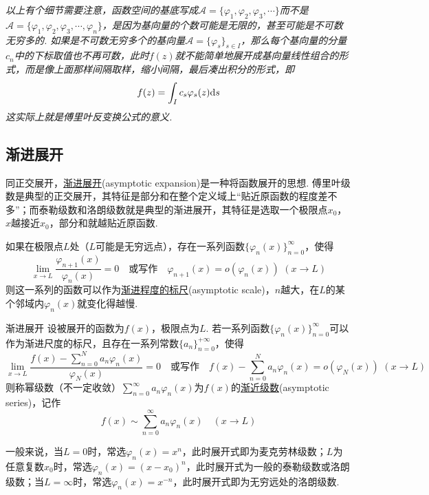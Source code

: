 \documentclass[main.tex]{subfiles}
\begin{document}
\textit{
    以上有个细节需要注意，函数空间的基底写成\(\mathcal{A}=\{\varphi_1,\varphi_2,\varphi_3,\cdots\}\)而不是\(\mathcal{A}=\{\varphi_1,\varphi_2,\varphi_3,\cdots,\varphi_n\}\)，是因为基向量的个数可能是无限的，甚至可能是不可数无穷多的. 如果是不可数无穷多个的基向量\(\mathcal{A}=\{\varphi_s\}_{s \in I}\)，那么每个基向量的分量\(c_n\)中的下标取值也不再可数，此时\(f(z)\)就不能简单地展开成基向量线性组合的形式，而是像上面那样间隔取样，缩小间隔，最后凑出积分的形式，即
    \[f(z)=\int_{I}c_s\varphi_s(z){\rm d}s\]
    这实际上就是傅里叶反变换公式的意义.
}


\subsection{渐进展开}

同正交展开，\uline{渐进展开}(asymptotic expansion)是一种将函数展开的思想. 傅里叶级数是典型的正交展开，其特征是部分和在整个定义域上“贴近原函数的程度差不多”；而泰勒级数和洛朗级数就是典型的渐进展开，其特征是选取一个极限点\(x_0\)，\(x\)越接近\(x_0\)，部分和就越贴近原函数. 

如果在极限点\(L\)处（\(L\)可能是无穷远点），存在一系列函数\(\{\varphi_n(x)\}_{n=0}^{\infty}\)，使得
\[\lim_{x \to L} \frac{\varphi_{n+1}(x)}{\varphi_n(x)} = 0 \quad \mbox{或写作} \quad \varphi_{n+1}(x)=o(\varphi_n(x)) \,\, (x \to L)\]
则这一系列的函数可以作为\uline{渐进程度的标尺}(asymptotic scale)，\(n\)越大，在\(L\)的某个邻域内\(\varphi_n(x)\)就变化得越慢. 

\begin{definition}{渐进展开}
    设被展开的函数为\(f(x)\)，极限点为\(L\). 若一系列函数\(\{\varphi_n(x)\}_{n=0}^{\infty}\)可以作为渐进尺度的标尺，且存在一系列常数\(\{a_n\}_{n=0}^{+\infty}\)，使得
    \[\lim_{x \to L} \frac{f(x) - \displaystyle{\sum_{n=0}^{N}a_n\varphi_n(x)}}{\varphi_N(x)} = 0 \quad \mbox{或写作} \quad f(x) - \sum_{n=0}^{N}a_n\varphi_n(x) = o(\varphi_N(x)) \,\, (x \to L)\]
    则称幂级数（不一定收敛）\(\displaystyle{\sum_{n=0}^{\infty}a_n\varphi_n(x)}\)为\(f(x)\)的\uline{渐近级数}(asymptotic series)，记作
    \[f(x) \sim \sum_{n=0}^{\infty}a_n\varphi_n(x) \quad (x \to L)\]
\end{definition}

一般来说，当\(L=0\)时，常选\(\varphi_n(x)=x^n\)，此时展开式即为麦克劳林级数；\(L\)为任意复数\(x_0\)时，常选\(\varphi_n(x) = (x-x_0)^n\)，此时展开式为一般的泰勒级数或洛朗级数；当\(L=\infty\)时，常选\(\varphi_n(x)=x^{-n}\)，此时展开式即为无穷远处的洛朗级数.
\end{document}
